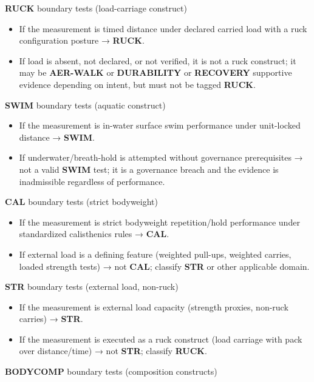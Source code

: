 \documentclass[10pt]{article}
\begin{document}
\textbf{RUCK} boundary tests (load-carriage construct)

\begin{itemize}
\item If the measurement is timed distance under declared carried load with a ruck configuration posture → \textbf{RUCK}.
\item If load is absent, not declared, or not verified, it is not a ruck construct; it may be \textbf{AER-WALK} or \textbf{DURABILITY} or \textbf{RECOVERY} supportive evidence depending on intent, but must not be tagged \textbf{RUCK}.
\end{itemize}

\textbf{SWIM} boundary tests (aquatic construct)

\begin{itemize}
\item If the measurement is in-water surface swim performance under unit-locked distance → \textbf{SWIM}.
\item If underwater/breath-hold is attempted without governance prerequisites → not a valid \textbf{SWIM} test; it is a governance breach and the evidence is inadmissible regardless of performance.
\end{itemize}

\textbf{CAL} boundary tests (strict bodyweight)

\begin{itemize}
\item If the measurement is strict bodyweight repetition/hold performance under standardized calisthenics rules → \textbf{CAL}.
\item If external load is a defining feature (weighted pull-ups, weighted carries, loaded strength tests) → not \textbf{CAL}; classify \textbf{STR} or other applicable domain.
\end{itemize}

\textbf{STR} boundary tests (external load, non-ruck)

\begin{itemize}
\item If the measurement is external load capacity (strength proxies, non-ruck carries) → \textbf{STR}.
\item If the measurement is executed as a ruck construct (load carriage with pack over distance/time) → not \textbf{STR}; classify \textbf{RUCK}.
\end{itemize}

\textbf{BODYCOMP} boundary tests (composition constructs)
\end{document}
